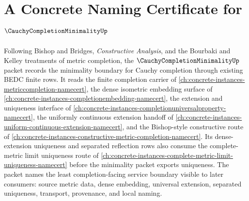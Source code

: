 \chapter{A Concrete Naming Certificate for $\CauchyCompletionMinimalityUp$}
\label{ch:concrete-instances-cauchycompletionminimality-namecert}

Following Bishop and Bridges, \emph{Constructive Analysis}, and the Bourbaki and Kelley treatments of metric completion, the $\CauchyCompletionMinimalityUp$ packet records the minimality boundary for Cauchy completion through existing BEDC finite rows. It reads the finite completion carrier of \autoref{ch:concrete-instances-metriccompletion-namecert}, the dense isometric embedding surface of \autoref{ch:concrete-instances-completionembedding-namecert}, the extension and uniqueness interface of \autoref{ch:concrete-instances-completionuniversalproperty-namecert}, the uniformly continuous extension handoff of \autoref{ch:concrete-instances-uniform-continuous-extension-namecert}, and the Bishop-style constructive route of \autoref{ch:concrete-instances-constructive-metric-completion-namecert}. Its dense-extension uniqueness and separated reflection rows also consume the complete-metric limit uniqueness route of \autoref{ch:concrete-instances-complete-metric-limit-uniqueness-namecert} before the minimality packet exports uniqueness. The packet names the least completion-facing service boundary visible to later consumers: source metric data, dense embedding, universal extension, separated uniqueness, transport, provenance, and local naming.

